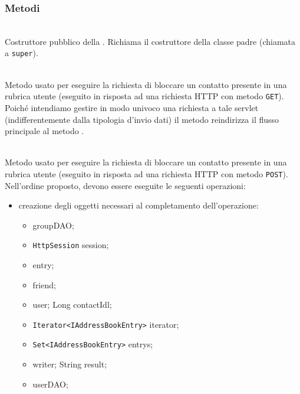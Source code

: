 \subsubsection*{Metodi}

\begin{description}
	\item{}\\
	Costruttore pubblico della . Richiama il costruttore della classe padre (chiamata a \texttt{super}).
	
	\item{}\\
	Metodo usato per eseguire la richiesta di bloccare un contatto presente in una rubrica utente (eseguito in risposta ad una richiesta HTTP con metodo \texttt{GET}). Poiché intendiamo gestire in modo univoco una richiesta a tale servlet (indifferentemente dalla tipologia d'invio dati) il metodo reindirizza il flusso principale al metodo .
	
	\item{}\\	
	Metodo usato per eseguire la richiesta di bloccare un contatto presente in una rubrica utente (eseguito in risposta ad una richiesta HTTP con metodo \texttt{POST}). Nell'ordine proposto, devono essere eseguite le seguenti operazioni:
	\begin{itemize}
		\item creazione degli oggetti necessari al completamento dell'operazione:
		\begin{itemize}
			\item {} groupDAO;
			\item \texttt{HttpSession} session;
			\item {} entry;
			\item {} friend;
			\item {} user;
			Long contactIdl;
			\item \texttt{Iterator<IAddressBookEntry>} iterator;
			\item \texttt{Set<IAddressBookEntry>} entrys;
			\item {} writer;
			String result;
			\item {} userDAO;
		\end{itemize}
		

\end{itemize}
\end{description}
